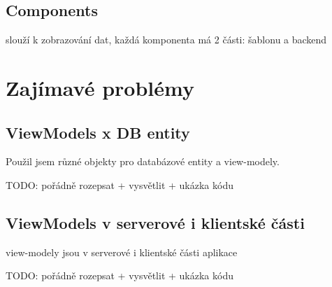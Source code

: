 \subsection{Components}

slouží k zobrazování dat, každá komponenta má 2 části: šablonu a backend

\section{Zajímavé problémy}

\subsection{ViewModels x DB entity}

Použil jsem různé objekty pro databázové entity a view-modely.

TODO: pořádně rozepsat + vysvětlit + ukázka kódu

\subsection{ViewModels v serverové i klientské části}

view-modely jsou v serverové i klientské části aplikace

TODO: pořádně rozepsat + vysvětlit + ukázka kódu
